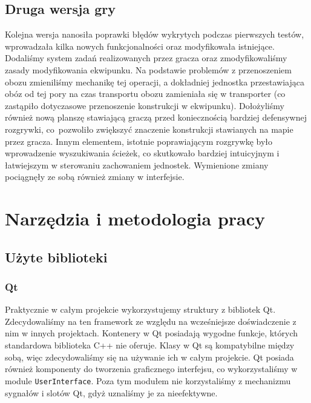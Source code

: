 \documentclass[licencjacka]{pracamgr}
\begin{document}
    \section{Druga wersja gry}
    Kolejna wersja nanosiła poprawki błędów wykrytych podczas pierwszych testów, wprowadzała kilka nowych funkcjonalności
    oraz modyfikowała istniejące. Dodaliśmy system zadań realizowanych przez gracza oraz zmodyfikowaliśmy zasady modyfikowania
    ekwipunku. Na podstawie problemów z przenoszeniem obozu zmieniliśmy mechanikę tej operacji, a dokładniej jednostka przestawiająca
    obóz od tej pory na czas transportu obozu zamieniała się w transporter (co zastąpiło dotyczasowe przenoszenie konstrukcji w ekwipunku).
    Dołożyliśmy również nową planszę stawiającą graczą przed koniecznością bardziej defensywnej rozgrywki,
    co~pozwoliło zwiększyć znaczenie konstrukcji stawianych na mapie przez gracza. Innym elementem, istotnie poprawiającym
    rozgrywkę było wprowadzenie wyszukiwania ścieżek, co skutkowało bardziej intuicyjnym i łatwiejszym w sterowaniu
    zachowaniem jednostek. Wymienione zmiany pociągnęły ze sobą również zmiany w interfejsie.

\chapter{Narzędzia i metodologia pracy}
  \section{Użyte biblioteki}
    \subsection{Qt}
    Praktycznie w całym projekcie wykorzystujemy struktury z bibliotek Qt. Zdecydowaliśmy na ten framework ze względu
    na wcześniejsze doświadczenie z nim w innych projektach. Kontenery w Qt posiadają wygodne funkcje, których
    standardowa biblioteka C++ nie oferuje.
    Klasy w Qt są kompatybilne między sobą, więc zdecydowaliśmy się na używanie ich w całym projekcie.
    Qt posiada również komponenty do tworzenia graficznego interfejsu, co wykorzystaliśmy w module \texttt{UserInterface}.
    Poza tym modułem nie korzystaliśmy z mechanizmu sygnałów i slotów Qt, gdyż uznaliśmy je za nieefektywne.
\end{document}
